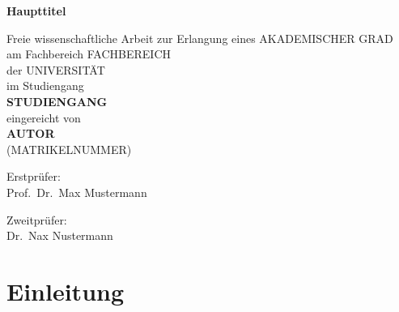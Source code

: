 \documentclass[article, a4paper, oneside, 12pt, toc=listof]{memoir}
\begin{document}

\begin{titlingpage}
    \vspace*{.2\textheight}

    {\noindent\centering\sffamily\bfseries\LARGE
      Haupttitel\par}

    \vspace*{.3\baselineskip}


   \vspace*{.125\textheight}

   {\noindent\centering\rmfamily\large Freie wissenschaftliche Arbeit
     zur Erlangung eines AKADEMISCHER GRAD\\am Fachbereich FACHBEREICH\\der
     UNIVERSITÄT\\[2ex] im Studiengang\\{\sffamily\textbf{
     STUDIENGANG}}\\[4ex]eingereicht von\\\sffamily
     \textbf{AUTOR}\\\rmfamily (MATRIKELNUMMER)\par}

    \vspace*{\fill}

    \noindent
    \begin{minipage}[b]{.5\textwidth}
        \noindent\rmfamily\normalsize
        Erstprüfer:\\Prof.~Dr.~Max Mustermann
    \end{minipage}\hfill
    \begin{minipage}[b]{.5\textwidth}
       \noindent\flushright\rmfamily\normalsize
       Zweitprüfer:\\Dr.~Nax Nustermann
    \end{minipage}
\end{titlingpage}

\clearpage




\tableofcontents*


\clearpage


\OnehalfSpacing

\section{Einleitung}
\end{document}
